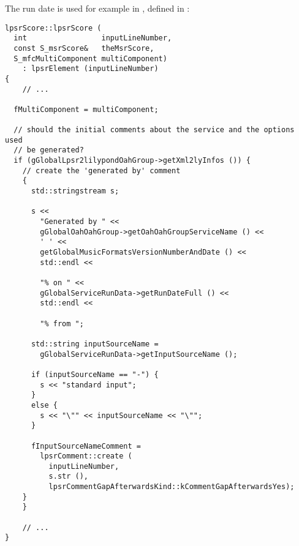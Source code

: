 The run date is used for example in , defined in :%
\begin{lstlisting}[language=CPlusPlus]
lpsrScore::lpsrScore (
  int                 inputLineNumber,
  const S_msrScore&   theMsrScore,
  S_mfcMultiComponent multiComponent)
    : lpsrElement (inputLineNumber)
{
	// ...

  fMultiComponent = multiComponent;

  // should the initial comments about the service and the options used
  // be generated?
  if (gGlobalLpsr2lilypondOahGroup->getXml2lyInfos ()) {
    // create the 'generated by' comment
    {
      std::stringstream s;

      s <<
        "Generated by " <<
        gGlobalOahOahGroup->getOahOahGroupServiceName () <<
        ' ' <<
        getGlobalMusicFormatsVersionNumberAndDate () <<
        std::endl <<

        "% on " <<
        gGlobalServiceRunData->getRunDateFull () <<
        std::endl <<

        "% from ";

      std::string inputSourceName =
        gGlobalServiceRunData->getInputSourceName ();

      if (inputSourceName == "-") {
        s << "standard input";
      }
      else {
        s << "\"" << inputSourceName << "\"";
      }

      fInputSourceNameComment =
        lpsrComment::create (
          inputLineNumber,
          s.str (),
          lpsrCommentGapAfterwardsKind::kCommentGapAfterwardsYes);
    }
	}

	// ...
}
\end{lstlisting}

